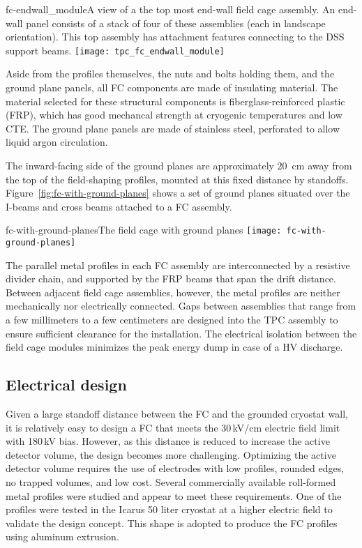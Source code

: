 \begin{cdrfigure}{fc-endwall_module}{A view of a the top most end-wall field cage assembly. An end-wall panel consists of a stack of four of these assemblies (each in landscape orientation).  This top assembly has attachment features connecting to the DSS support beams.}
\texttt{[image: tpc\_fc\_endwall\_module]}
\end{cdrfigure}

Aside from the profiles themselves, the nuts and bolts holding them, and the ground plane panels, all FC components are made of insulating material. The material selected for these structural components is fiberglass-reinforced plastic (FRP), which has good mechancal strength at cryogenic temperatures and low CTE. The ground plane panels are made of stainless steel, perforated to allow liquid argon circulation. 

The inward-facing side of the ground planes are approximately 20~cm away from the top of the field-shaping profiles, mounted at this fixed distance %
by standoffs. Figure~\ref{fig:fc-with-ground-planes} shows a set of ground planes situated over the I-beams and cross beams attached to a FC assembly.

\begin{cdrfigure}{fc-with-ground-planes}{The field cage with ground planes}
\texttt{[image: fc-with-ground-planes]}
\end{cdrfigure}

The parallel metal profiles in each FC assembly 
 are interconnected by a resistive divider chain, and supported by the FRP beams that span the drift distance.  Between adjacent field cage assemblies, however,  
the metal profiles are neither mechanically nor electrically connected. Gaps between assemblies that range from a few millimeters to a few centimeters are designed into the TPC assembly to ensure sufficient clearance for the installation.  The electrical isolation between the field cage modules minimizes the peak energy dump in case of a HV discharge.


\subsection{Electrical design}

Given a large standoff distance between the FC and the grounded cryostat wall, it is relatively easy to design a FC that meets the 30\,kV/cm electric field limit with 180\,kV bias.  However, as this distance is reduced to increase the active detector volume, the design becomes more challenging.  Optimizing the active detector volume requires the use of electrodes with low profiles, rounded edges, no trapped volumes, and low cost.  Several commercially available roll-formed metal profiles were studied and appear to meet these requirements. One of the profiles were tested in the Icarus 50 liter cryostat at a higher electric field to validate the design concept.  This shape is adopted to produce the FC profiles using aluminum extrusion.

